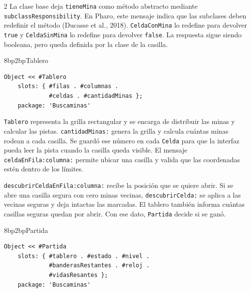 \documentclass[a4paper,10pt]{article}
\makeatletter
\renewcommand{\subsubsection}{\@startsection{subsubsection}{3}{0pt}
  {8bp}{2bp}{\normalfont\fontsize{10bp}{12bp}\selectfont\bfseries}}
\makeatother
\begin{document}
\begin{multicols}{2}
La clase base deja \texttt{tieneMina} como método abstracto mediante \texttt{subclassResponsibility}. En Pharo, este mensaje indica que las subclases deben redefinir el método (Ducasse et al., 2018). \texttt{CeldaConMina} lo redefine para devolver \texttt{true} y \texttt{CeldaSinMina} lo redefine para devolver \texttt{false}. La respuesta sigue siendo booleana, pero queda definida por la clase de la casilla.

\begin{samepage}
\subsubsection{Tablero}
\begingroup
\fontsize{8.5bp}{10.5bp}\selectfont
\setlength{\topsep}{3bp}
\setlength{\partopsep}{0pt}
\begin{verbatim}
Object << #Tablero
    slots: { #filas . #columnas .
             #celdas . #cantidadMinas };
    package: 'Buscaminas'
\end{verbatim}
\endgroup
\end{samepage}

\texttt{Tablero} representa la grilla rectangular y se encarga de distribuir las minas y calcular las pistas. \texttt{cantidadMinas:} genera la grilla y calcula cuántas minas rodean a cada casilla. Se guardó ese número en cada \texttt{Celda} para que la interfaz pueda leer la pista cuando la casilla queda visible. El mensaje \texttt{celdaEnFila:columna:} permite ubicar una casilla y valida que las coordenadas estén dentro de los límites.

\texttt{descubrirCeldaEnFila:columna:} recibe la posición que se quiere abrir. Si se abre una casilla segura con cero minas vecinas, \texttt{descubrirCelda:} se aplica a las vecinas seguras y deja intactas las marcadas. El tablero también informa cuántas casillas seguras quedan por abrir. Con ese dato, \texttt{Partida} decide si se ganó.

\begin{samepage}
\subsubsection{Partida}
\begingroup
\fontsize{8.5bp}{10.5bp}\selectfont
\setlength{\topsep}{3bp}
\setlength{\partopsep}{0pt}
\begin{verbatim}
Object << #Partida
    slots: { #tablero . #estado . #nivel .
             #banderasRestantes . #reloj .
             #vidasResantes };
    package: 'Buscaminas'
\end{verbatim}
\endgroup
\end{samepage}


\end{multicols}
\end{document}
